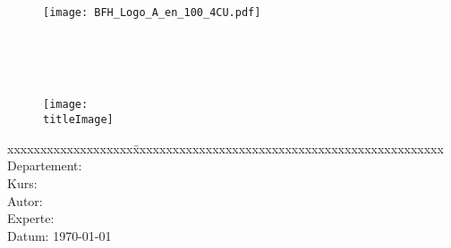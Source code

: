 \thispagestyle{empty}

\begin{figure}
	\texttt{[image: BFH\_Logo\_A\_en\_100\_4CU.pdf]}
\end{figure}


\begin{minipage}[c][3cm][c]{\linewidth} {
	\centering
	\vspace*{2cm}
	{\fontsize{24pt}{0pt}\selectfont \textbf{\doctitle}}  \\
	\vspace*{0.6cm}
	{\fontsize{20pt}{0pt}\selectfont {Geodeatenprozessierung\\ mit Budget Instanzen (SPOT)\\ auf Amazon EKS}}  \\
	\vspace*{1cm}
	{\fontsize{14pt}{0pt}\selectfont \doctype}  \\
}
\end{minipage}


\vspace{1.5cm}


\begin{figure}[H]
	\centering
	\makebox[0.8\linewidth]{\color{BFHGray} \rule{0.8\linewidth}{10pt}}
	\texttt{[image: \\titleImage]}
	\makebox[0.8\linewidth]{\color{BFHGray} \rule{0.8\linewidth}{10pt}}
\end{figure}

\vfill

\begin{minipage}[c][3cm][c]{\linewidth}
{
	\centering
	\begin{tabbing}
		xxxxxxxxxxxxxxxxxxx\=xxxxxxxxxxxxxxxxxxxxxxxxxxxxxxxxxxxxxxxxxxxxxxx \kill
		Departement:	\> \fieldofstudies \\
		Kurs:			\> \course \\
		Autor:		\> \docauthor \\
		Experte:		\> \prof \\
		Datum:			\> \today \\
	\end{tabbing}
}
\end{minipage}

\pagebreak
